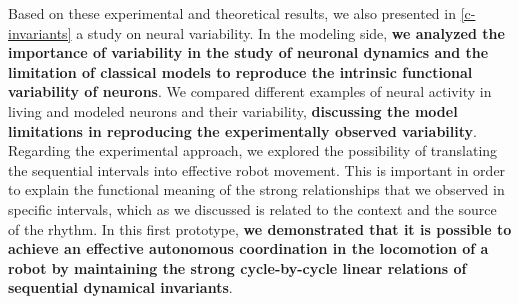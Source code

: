 Based on these experimental and theoretical results, we also presented in \ref{c-invariants} a study on neural variability. In the modeling side, \textbf{we analyzed the importance of variability in the study of neuronal dynamics and the limitation of classical models to reproduce the intrinsic functional variability of neurons}. We compared different examples of neural activity in living and modeled neurons and their variability, \textbf{ discussing the model limitations in reproducing the experimentally observed variability}. Regarding the experimental approach, we explored the possibility of translating the sequential intervals into effective robot movement. This is important in order to explain the functional meaning of the strong relationships that we observed in specific intervals, which as we discussed is related to the context and the source of the rhythm. In this first prototype, \textbf{we demonstrated that it is possible to achieve an effective autonomous coordination in the locomotion of a robot by maintaining the strong cycle-by-cycle linear relations of sequential dynamical invariants}.

